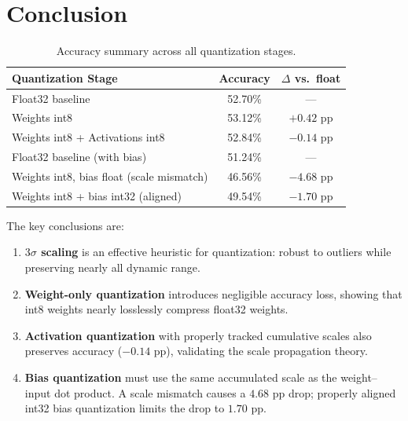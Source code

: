 \documentclass[11pt, letterpaper]{article}
\begin{document}
\section{Conclusion}

\begin{table}[H]
  \centering
  \caption{Accuracy summary across all quantization stages.}
  \label{tab:summary}
  \begin{tabular}{lcc}
    \toprule
    \textbf{Quantization Stage}                    & \textbf{Accuracy} & \textbf{$\Delta$ vs.\ float} \\
    \midrule
    Float32 baseline                               & 52.70\%  & ---         \\
    Weights int8                                   & 53.12\%  & $+0.42$ pp  \\
    Weights int8 + Activations int8                & 52.84\%  & $-0.14$ pp  \\
    \midrule
    Float32 baseline (with bias)                   & 51.24\%  & ---         \\
    Weights int8, bias float (scale mismatch)      & 46.56\%  & $-4.68$ pp  \\
    Weights int8 + bias int32 (aligned)            & 49.54\%  & $-1.70$ pp  \\
    \bottomrule
  \end{tabular}
\end{table}

The key conclusions are:
\begin{enumerate}
  \item \textbf{$3\sigma$ scaling} is an effective heuristic for quantization:
        robust to outliers while preserving nearly all dynamic range.
  \item \textbf{Weight-only quantization} introduces negligible accuracy loss,
        showing that int8 weights nearly losslessly compress float32 weights.
  \item \textbf{Activation quantization} with properly tracked cumulative scales
        also preserves accuracy ($-0.14$ pp), validating the scale propagation theory.
  \item \textbf{Bias quantization} must use the same accumulated scale as the
        weight--input dot product. A scale mismatch causes a $4.68$ pp drop;
        properly aligned int32 bias quantization limits the drop to $1.70$ pp.
\end{enumerate}
\end{document}
